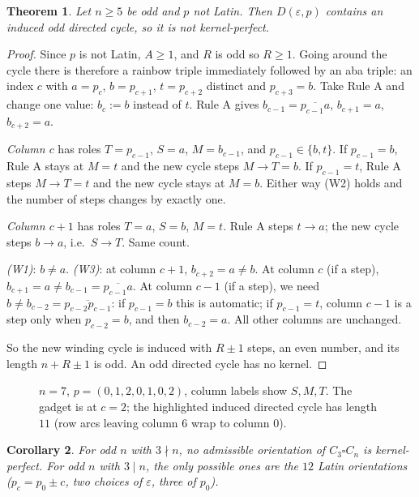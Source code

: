 \documentclass[11pt]{article}
\theoremstyle{plain}
\newtheorem{theorem}{Theorem}
\newtheorem{corollary}[theorem]{Corollary}
\theoremstyle{definition}
\theoremstyle{remark}
\begin{document}
\begin{theorem}\label{thm:onlyif}
Let $n\ge5$ be odd and $p$ not Latin. Then $D(\varepsilon,p)$ contains an induced odd
directed cycle, so it is not kernel-perfect.
\end{theorem}
\begin{proof}
Since $p$ is not Latin, $A\ge1$, and $R$ is odd so $R\ge1$. Going around the cycle there
is therefore a rainbow triple immediately followed by an aba triple: an index $c$ with
$a=p_c$, $b=p_{c+1}$, $t=p_{c+2}$ distinct and $p_{c+3}=b$. Take Rule A and change one
value: $b_c:=b$ instead of $t$. Rule A gives $b_{c-1}=\overline{p_{c-1}a}$, $b_{c+1}=a$,
$b_{c+2}=a$.

\emph{Column $c$} has roles $T=p_{c-1}$, $S=a$, $M=b_{c-1}$, and $p_{c-1}\in\{b,t\}$.
If $p_{c-1}=b$, Rule A stays at $M=t$ and the new cycle steps $M\to T=b$. If $p_{c-1}=t$,
Rule A steps $M\to T=t$ and the new cycle stays at $M=b$. Either way (W2) holds and the
number of steps changes by exactly one.

\emph{Column $c+1$} has roles $T=a$, $S=b$, $M=t$. Rule A steps $t\to a$; the new cycle
steps $b\to a$, i.e.\ $S\to T$. Same count.

\emph{(W1)}: $b\ne a$. \emph{(W3)}: at column $c+1$, $b_{c+2}=a\ne b$. At column $c$ (if a
step), $b_{c+1}=a\ne b_{c-1}=\overline{p_{c-1}a}$. At column $c-1$ (if a step), we need
$b\ne b_{c-2}=\overline{p_{c-2}p_{c-1}}$: if $p_{c-1}=b$ this is automatic; if
$p_{c-1}=t$, column $c-1$ is a step only when $p_{c-2}=b$, and then $b_{c-2}=a$. All other
columns are unchanged.

So the new winding cycle is induced with $R\pm1$ steps, an even number, and its length
$n+R\pm1$ is odd. An odd directed cycle has no kernel.
\end{proof}

\begin{figure}[ht]
\centering
\resizebox{\textwidth}{!}{}
\caption{$n=7$, $p=(0,1,2,0,1,0,2)$, column labels show $S,M,T$. The gadget is at $c=2$;
the highlighted induced directed cycle has length $11$ (row arcs leaving column $6$
wrap to column $0$).}
\end{figure}

\begin{corollary}
For odd $n$ with $3\nmid n$, no admissible orientation of $C_3\square C_n$ is
kernel-perfect. For odd $n$ with $3\mid n$, the only possible ones are the $12$ Latin
orientations ($p_c=p_0\pm c$, two choices of $\varepsilon$, three of $p_0$).
\end{corollary}
\end{document}
